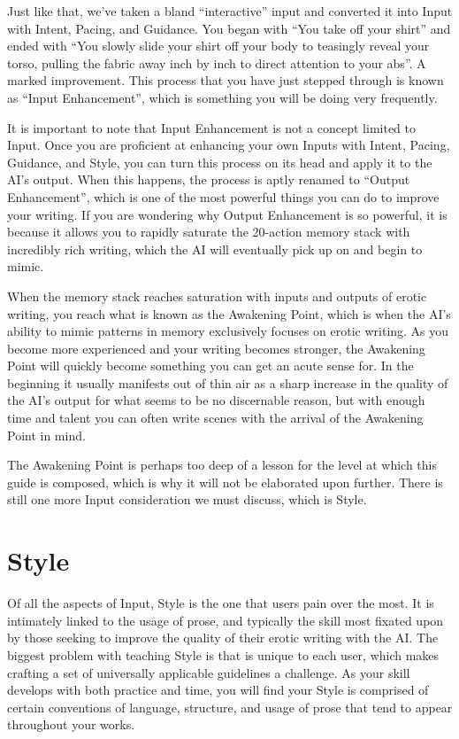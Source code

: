\documentclass[Source-main.tex]{subfiles}
\begin{document}
Just like that, we’ve taken a bland “interactive” input and converted it into Input with Intent, Pacing, and Guidance.
You began with “You take off your shirt” and ended with “You slowly slide your shirt off your body to teasingly reveal your torso, pulling the fabric away inch by inch to direct attention to your abs”.
A marked improvement.
This process that you have just stepped through is known as “Input Enhancement”, which is something you will be doing very frequently.

It is important to note that Input Enhancement is not a concept limited to Input.
Once you are proficient at enhancing your own Inputs with Intent, Pacing, Guidance, and Style, you can turn this process on its head and apply it to the AI’s output.
When this happens, the process is aptly renamed to “Output Enhancement”, which is one of the most powerful things you can do to improve your writing.
If you are wondering why Output Enhancement is so powerful, it is because it allows you to rapidly saturate the 20-action memory stack with incredibly rich writing, which the AI will eventually pick up on and begin to mimic.

When the memory stack reaches saturation with inputs and outputs of erotic writing, you reach what is known as the Awakening Point, which is when the AI’s ability to mimic patterns in memory exclusively focuses on erotic writing.
As you become more experienced and your writing becomes stronger, the Awakening Point will quickly become something you can get an acute sense for.
In the beginning it usually manifests out of thin air as a sharp increase in the quality of the AI’s output for what seems to be no discernable reason, but with enough time and talent you can often write scenes with the arrival of the Awakening Point in mind.

The Awakening Point is perhaps too deep of a lesson for the level at which this guide is composed, which is why it will not be elaborated upon further.
There is still one more Input consideration we must discuss, which is Style.

\chapter{Style}
\label{ch:style}

Of all the aspects of Input, Style is the one that users pain over the most.
It is intimately linked to the usage of prose, and typically the skill most fixated upon by those seeking to improve the quality of their erotic writing with the AI.
The biggest problem with teaching Style is that is unique to each user, which makes crafting a set of universally applicable guidelines a challenge.
As your skill develops with both practice and time, you will find your Style is comprised of certain conventions of language, structure, and usage of prose that tend to appear throughout your works.
\end{document}
